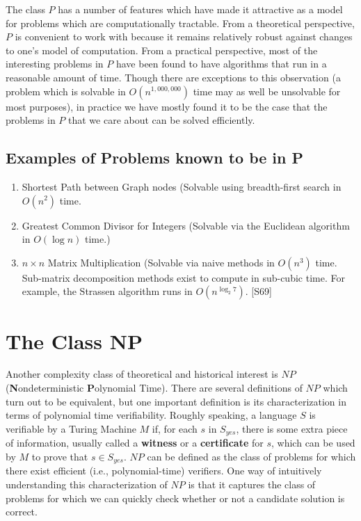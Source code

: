 \documentclass{article}
\renewcommand{\cite}[1]{[#1]}
\renewcommand{\cite}[1]{[#1]}
\begin{document}
The class $P$ has a number of features which have made it attractive
as a model for problems which are computationally tractable.  From a
theoretical perspective, $P$ is convenient to work with because it
remains relatively robust against changes to one's model of
computation.  From a practical perspective, most of the interesting
problems in $P$ have been found to have algorithms that run in a
reasonable amount of time.  Though there are exceptions to this
observation (a problem which is solvable in $O(n^{1,000,000})$ time
may as well be unsolvable for most purposes), in practice we have
mostly found it to be the case that the problems in $P$ that we care
about can be solved efficiently.

\subsection*{Examples of Problems known to be in P}

\begin{enumerate}
\item{Shortest Path between Graph nodes (Solvable using
    breadth-first search in $O(n^2)$ time.}
\item{Greatest Common Divisor for Integers (Solvable via the Euclidean
    algorithm in $O(\log{n})$ time.)}
  
\item $n \times n$ Matrix Multiplication (Solvable via naive methods
  in $O(n^3)$ time.  Sub-matrix decomposition methods exist to
  compute in sub-cubic time.  For example, the Strassen algorithm
  runs in $O(n^{\log_2 7})$. \cite{S69}
    
\end{enumerate}

\section{The Class NP}

Another complexity class of theoretical and historical interest is
$NP$ (\textbf{N}ondeterministic \textbf{P}olynomial Time).  There
are several definitions of $NP$ which turn out to be equivalent, but
one important definition is its characterization in terms of
polynomial time verifiability.  Roughly speaking, a language $S$ is
verifiable by a Turing Machine $M$ if, for each $s$ in $S_{yes}$,
there is some extra piece of information, usually called a
\textbf{witness} or a \textbf{certificate} for $s$, which can be
used by $M$ to prove that $s \in S_{yes}$. $NP$ can be defined as
the class of problems for which there exist efficient (i.e.,
polynomial-time) verifiers. One way of intuitively understanding this
characterization of $NP$ is that it captures the class of problems
for which we can quickly check whether or not a candidate solution
is correct.
\end{document}

